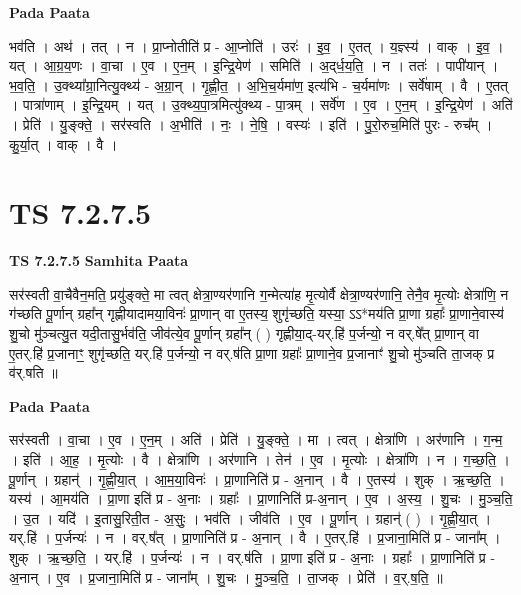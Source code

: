 \documentclass[17pt]{extarticle}
\begin{document}
\textbf{Pada Paata} \newline

भव॑ति । अथ॑ । तत् । न । प्रा॒प्नोतीति॑ प्र - आ॒प्नोति॑ । उरः॑ । इ॒व॒ । ए॒तत् । य॒ज्ञ्स्य॑ । वाक् । इ॒व॒ । यत् । आ॒ग्र॒य॒णः । वा॒चा । ए॒व । ए॒न॒म् । इ॒न्द्रि॒येण॑ । समिति॑ । अ॒द्‌र्ध॒य॒ति॒ । न । ततः॑ । पापी॑यान् । भ॒व॒ति॒ । उ॒क्थ्या᳚ग्रा॒नित्यु॒क्थ्य॑ - अ॒ग्रा॒न् । गृ॒ह्णी॒त॒ । अ॒भि॒च॒र्यमा॑ण॒ इत्य॑भि - च॒र्यमा॑णः । सर्वे॑षाम् । वै । ए॒तत् । पात्रा॑णाम् । इ॒न्द्रि॒यम् । यत् । उ॒क्थ्य॒पा॒त्रमित्यु॑क्थ्य - पा॒त्रम् । सर्वे॑ण । ए॒व । ए॒न॒म् । इ॒न्द्रि॒येण॑ । अति॑ । प्रेति॑ । यु॒ङ्क्ते॒ । सर॑स्वति । अ॒भीति॑ । नः॒ । ने॒षि॒ । वस्यः॑ । इति॑ । पु॒रो॒रुच॒मिति॑ पुरः - रुच᳚म् । कु॒र्या॒त् । वाक् । वै ।  \newline





\section{ TS 7.2.7.5 }

\textbf{TS 7.2.7.5 } \newline
\textbf{Samhita Paata} \newline

सर॑स्वती वा॒चैवैन॒मति॒ प्रयु॑ङ्क्ते॒ मा त्वत् क्षेत्रा॒ण्यर॑णानि ग॒न्मेत्या॑ह मृ॒त्योर्वै क्षेत्रा॒ण्यर॑णानि॒ तेनै॒व मृ॒त्योः क्षेत्रा॑णि॒ न ग॑च्छति पू॒र्णान् ग्रहा᳚न् गृह्णीयादामया॒विनः॑ प्रा॒णान् वा ए॒तस्य॒ शुगृ॑च्छति॒ यस्या॒ ऽऽ*मय॑ति प्रा॒णा ग्रहाः᳚ प्रा॒णाने॒वास्य॑ शु॒चो मु॑ञ्चत्यु॒त यदी॒तासु॒र्भव॑ति॒ जीव॑त्ये॒व पू॒र्णान् ग्रहा᳚न् ( ) गृह्णीया॒द्-यर्.हि॑ प॒र्जन्यो॒ न वर्.षे᳚त् प्रा॒णान् वा ए॒तर्.हि॑ प्र॒जानाꣳ॒॒ शुगृ॑च्छति॒ यर्.हि॑ प॒र्जन्यो॒ न वर्.ष॑ति प्रा॒णा ग्रहाः᳚ प्रा॒णाने॒व प्र॒जानाꣳ॑ शु॒चो मु॑ञ्चति ता॒जक् प्र व॑र्.षति ॥ \newline

\textbf{Pada Paata} \newline

सर॑स्वती । वा॒चा । ए॒व । ए॒न॒म् । अति॑ । प्रेति॑ । यु॒ङ्क्ते॒ । मा । त्वत् । क्षेत्रा॑णि । अर॑णानि । ग॒न्म॒ । इति॑ । आ॒ह॒ । मृ॒त्योः । वै । क्षेत्रा॑णि । अर॑णानि । तेन॑ । ए॒व । मृ॒त्योः । क्षेत्रा॑णि । न । ग॒च्छ॒ति॒ । पू॒र्णान् । ग्रहान्॑ । गृ॒ह्णी॒या॒त् । आ॒म॒या॒विनः॑ । प्रा॒णानिति॑ प्र - अ॒नान् । वै । ए॒तस्य॑ । शुक् । ऋ॒च्छ॒ति॒ । यस्य॑ । आ॒मय॑ति । प्रा॒णा इति॑ प्र - अ॒नाः । ग्रहाः᳚ । प्रा॒णानिति॑ प्र-अ॒नान् । ए॒व । अ॒स्य॒ । शु॒चः । मु॒ञ्च॒ति॒ । उ॒त । यदि॑ । इ॒तासु॒रिती॒त - अ॒सुः॒ । भव॑ति । जीव॑ति । ए॒व । पू॒र्णान् । ग्रहान्॑ ( ) । गृ॒ह्णी॒या॒त् । यर्.हि॑ । प॒र्जन्यः॑ । न । वर्.ष᳚त् । प्रा॒णानिति॑ प्र - अ॒नान् । वै । ए॒तर्.हि॑ । प्र॒जाना॒मिति॑ प्र - जाना᳚म् । शुक् । ऋ॒च्छ॒ति॒ । यर्.हि॑ । प॒र्जन्यः॑ । न । वर्.ष॑ति । प्रा॒णा इति॑ प्र - अ॒नाः । ग्रहाः᳚ । प्रा॒णानिति॑ प्र - अ॒नान् । ए॒व । प्र॒जाना॒मिति॑ प्र - जाना᳚म् । शु॒चः । मु॒ञ्च॒ति॒ । ता॒जक् । प्रेति॑ । व॒र्.ष॒ति॒ ॥  \newline
\end{document}
